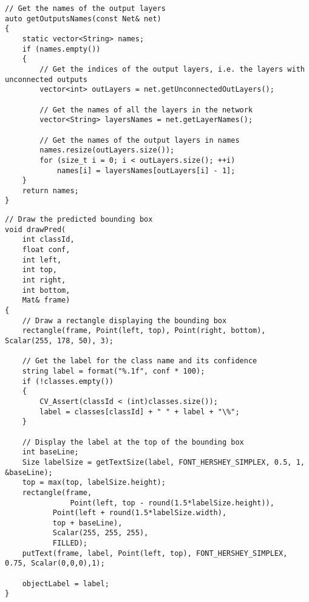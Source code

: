 \label{lst:getOutputsNames}
\begin{verbatim}
// Get the names of the output layers
auto getOutputsNames(const Net& net)
{
    static vector<String> names;
    if (names.empty())
    {
        // Get the indices of the output layers, i.e. the layers with unconnected outputs
        vector<int> outLayers = net.getUnconnectedOutLayers();

        // Get the names of all the layers in the network
        vector<String> layersNames = net.getLayerNames();

        // Get the names of the output layers in names
        names.resize(outLayers.size());
        for (size_t i = 0; i < outLayers.size(); ++i)
            names[i] = layersNames[outLayers[i] - 1];
    }
    return names;
}
\end{verbatim}

\label{lst:drawPred}
\begin{verbatim}
// Draw the predicted bounding box
void drawPred(
	int classId,
	float conf,
	int left,
	int top,
	int right,
	int bottom,
	Mat& frame)
{
    // Draw a rectangle displaying the bounding box
    rectangle(frame, Point(left, top), Point(right, bottom), Scalar(255, 178, 50), 3);

    // Get the label for the class name and its confidence
    string label = format("%.1f", conf * 100);
    if (!classes.empty())
    {
        CV_Assert(classId < (int)classes.size());
        label = classes[classId] + " " + label + "\%";
    }

    // Display the label at the top of the bounding box
    int baseLine;
    Size labelSize = getTextSize(label, FONT_HERSHEY_SIMPLEX, 0.5, 1, &baseLine);
    top = max(top, labelSize.height);
    rectangle(frame,
    		   Point(left, top - round(1.5*labelSize.height)),
		   Point(left + round(1.5*labelSize.width),
		   top + baseLine),
		   Scalar(255, 255, 255),
		   FILLED);
    putText(frame, label, Point(left, top), FONT_HERSHEY_SIMPLEX, 0.75, Scalar(0,0,0),1);

    objectLabel = label;
}
\end{verbatim}

